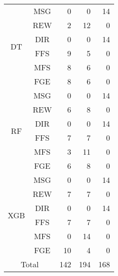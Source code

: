 \begin{table}[htbp]
\begin{center}
\begin{tabular}{|c|c|r|r|r|}
                \multirow{6}{*}{DT} & MSG & 0 & 0 & 14 \\
                \cline{2-5}
                    & REW & 2 & 12 & 0 \\
                \cline{2-5}
                    & DIR & 0 & 0 & 14 \\
                \cline{2-5}
                    & FFS & 9 & 5 & 0 \\
                \cline{2-5}
                    & MFS & 8 & 6 & 0 \\
                \cline{2-5}
                    & FGE & 8 & 6 & 0 \\
                \cline{1-5}

                \multirow{6}{*}{RF} & MSG & 0 & 0 & 14 \\
                \cline{2-5}
                    & REW & 6 & 8 & 0 \\
                \cline{2-5}
                    & DIR & 0 & 0 & 14 \\
                \cline{2-5}
                    & FFS & 7 & 7 & 0 \\
                \cline{2-5}
                    & MFS & 3 & 11 & 0 \\
                \cline{2-5}
                    & FGE & 6 & 8 & 0 \\
                \cline{1-5}
                
                \multirow{6}{*}{XGB} & MSG & 0 & 0 & 14 \\
                \cline{2-5}
                    & REW & 7 & 7 & 0 \\
                \cline{2-5}
                    & DIR & 0 & 0 & 14 \\
                \cline{2-5}
                    & FFS & 7 & 7 & 0 \\
                \cline{2-5}
                    & MFS & 0 & 14 & 0 \\
                \cline{2-5}
                    & FGE & 10 & 4 & 0 \\
                \cline{1-5}
                
                \multicolumn{2}{|c|}{Total} & 142 & 194 & 168 \\
                \hline
            \end{tabular}
    \end{center}
\end{table}